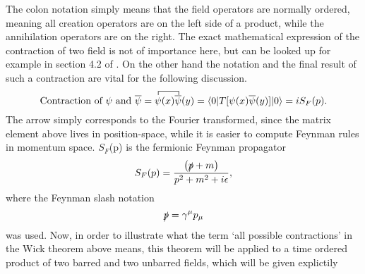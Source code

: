 The colon notation simply means that the field operators are normally ordered, meaning all creation operators are on the left side of a product, while the annihilation operators are on the right. The exact mathematical expression of the contraction of two field is not of importance here, but can be looked up for example in section 4.2 of \cite{Kopp:2016}. On the other hand the notation and the final result of such a contraction are vital for the following discussion.
\begin{equation*}
\text{Contraction of $\psi$ and $\overline{\psi}$}=
\contraction{}{\psi}{(x)}{\bar{\psi}}
\psi(x)\overline{\psi}(y)=\braket{0|T[\psi(x)\overline{\psi}(y)]|0}=iS_F(p).
\end{equation*}
The arrow simply corresponds to the Fourier transformed, since the matrix element above lives in position-space, while it is easier to compute Feynman rules in momentum space. $S_F$(p) is the fermionic Feynman propagator
\begin{equation*}
	S_F(p)=\frac{\left(\slashed p+m\right)}{p^2+m^2+i\epsilon},
\end{equation*}
where the Feynman slash notation
\begin{equation*}
	\slashed p=\gamma^\mu p_\mu
\end{equation*}
was used.
Now, in order to illustrate what the term `all possible contractions' in the Wick theorem above means, this theorem will be applied to a time ordered product of two barred and two unbarred fields, which will be given explictily
